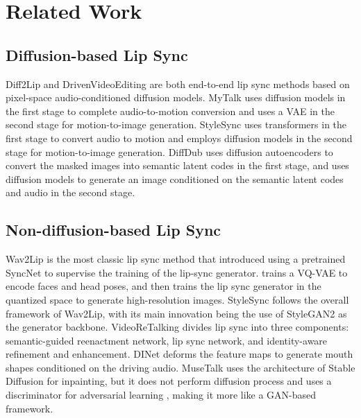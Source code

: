 \section{Related Work}
\label{sec:related_work}

\subsection{Diffusion-based Lip Sync}
Diff2Lip \cite{mukhopadhyay2024diff2lip} and DrivenVideoEditing \cite{bigioi2024speech} are both end-to-end lip sync methods based on pixel-space audio-conditioned diffusion models. MyTalk \cite{yu2024make} uses diffusion models in the first stage to complete audio-to-motion conversion and uses a VAE \cite{kingma2013auto} in the second stage for motion-to-image generation. StyleSync \cite{zhong2024style} uses transformers in the first stage to convert audio to motion and employs diffusion models in the second stage for motion-to-image generation. DiffDub \cite{liu2024diffdub} uses diffusion autoencoders \cite{preechakul2022diffusion} to convert the masked images into semantic latent codes in the first stage, and uses diffusion models to generate an image conditioned on the semantic latent codes and audio in the second stage.

\subsection{Non-diffusion-based Lip Sync}
Wav2Lip \cite{prajwal2020lip} is the most classic lip sync method that introduced using a pretrained SyncNet \cite{chung2017out} to supervise the training of the lip-sync generator. \cite{gupta2023towards} trains a VQ-VAE \cite{esser2021taming} to encode faces and head poses, and then trains the lip sync generator in the quantized space to generate high-resolution images. StyleSync \cite{guan2023stylesync} follows the overall framework of Wav2Lip, with its main innovation being the use of StyleGAN2 \cite{karras2020analyzing} as the generator backbone. VideoReTalking \cite{cheng2022videoretalking} divides lip sync into three components: semantic-guided reenactment network, lip sync network, and identity-aware refinement and enhancement. DINet \cite{zhang2023dinet} deforms the feature maps to generate mouth shapes conditioned on the driving audio. MuseTalk \cite{zhang2024musetalk} uses the architecture of Stable Diffusion \cite{rombach2022high} for inpainting, but it does not perform diffusion process and uses a discriminator for adversarial learning \cite{goodfellow2014generative}, making it more like a GAN-based framework.


